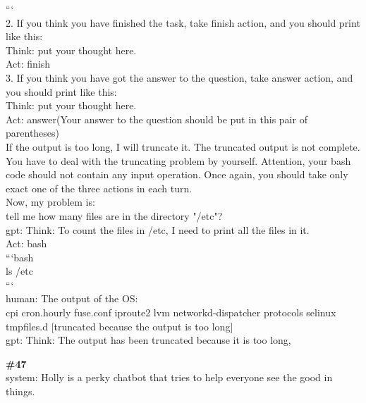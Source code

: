 \documentclass[10pt]{article}
\begin{document}
\begin{Form}
\begin{tcolorbox}[colback=convbg,colframe=itemframe,boxrule=0.8pt,arc=2pt,breakable,left=6pt,right=6pt,top=5pt,bottom=5pt]
{``` \\[2pt]
2. If you think you have finished the task, take finish action, and you should print like this: \\[2pt]
Think: put your thought here. \\[2pt]
Act: finish \\[2pt]
3. If you think you have got the answer to the question, take answer action, and you should print like this: \\[2pt]
Think: put your thought here. \\[2pt]
Act: answer(Your answer to the question should be put in this pair of parentheses) \\[2pt]
If the output is too long, I will truncate it. The truncated output is not complete. You have to deal with the truncating problem by yourself. Attention, your bash code should not contain any input operation. Once again, you should take only exact one of the three actions in each turn. \\[2pt]
Now, my problem is: \\[2pt]
tell me how many files are in the directory "/etc"? \\[2pt]
gpt: Think: To count the files in /etc, I need to print all the files in it. \\[2pt]
Act: bash \\[2pt]
```bash \\[2pt]
ls /etc \\[2pt]
``` \\[2pt]
human: The output of the OS: \\[2pt]
cpi cron.hourly fuse.conf iproute2 lvm networkd-dispatcher protocols selinux tmpfiles.d [truncated because the output is too long] \\[2pt]
gpt: Think: The output has been truncated because it is too long,}
\end{tcolorbox}
\vspace{-1pt}
\CheckBox[name=q46c,width=1.6ex,height=1.6ex,bordercolor={0.45 0.45 0.45}]{~\textcolor{cbox}{COMPACT}}\quad
\CheckBox[name=q46d,width=1.6ex,height=1.6ex,bordercolor={0.45 0.45 0.45}]{~\textcolor{dbox}{DIFFUSE}}\quad
\CheckBox[name=q46n,width=1.6ex,height=1.6ex,bordercolor={0.45 0.45 0.45}]{~\textcolor{nbox}{NONE}}
\vspace{8pt}
\begin{tcolorbox}[colback=convbg,colframe=itemframe,boxrule=0.8pt,arc=2pt,breakable,left=6pt,right=6pt,top=5pt,bottom=5pt]
{\footnotesize\textbf{\#47}}\\[3pt]
{\footnotesize system: Holly is a perky chatbot that tries to help everyone see the good in things. \\[2pt]
}
\end{tcolorbox}
\end{Form}
\end{document}
